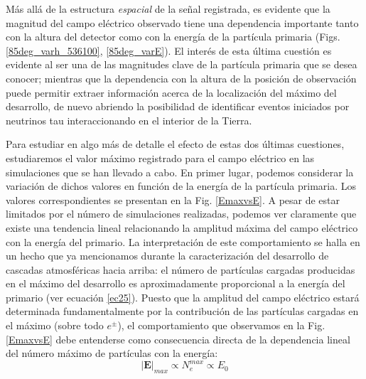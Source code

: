 \documentclass[11 pt, a4paper]{article} %
\numberwithin{equation}{section}
\numberwithin{figure}{section}
\numberwithin{table}{section}
\newcommand{\vect}[1]{\boldsymbol{\mathbf{#1}}}
\begin{document}
Más allá de la estructura \textit{espacial} de la señal registrada, es evidente que la magnitud del campo eléctrico observado tiene una dependencia importante tanto con la altura del detector como con la energía de la partícula primaria (Figs. \ref{85deg_varh_536100}, \ref{85deg_varE}). El interés de esta última cuestión es evidente al ser una de las magnitudes clave de la partícula primaria que se desea conocer; mientras que la dependencia con la altura de la posición de observación puede permitir extraer información acerca de la localización del máximo del desarrollo, de nuevo abriendo la posibilidad de identificar eventos iniciados por neutrinos tau interaccionando en el interior de la Tierra.

Para estudiar en algo más de detalle el efecto de estas dos últimas cuestiones, estudiaremos el valor máximo registrado para el campo eléctrico en las simulaciones que se han llevado a cabo. En primer lugar, podemos considerar la variación de dichos valores en función de la energía de la partícula primaria. Los valores correspondientes se presentan en la Fig. \ref{EmaxvsE}. A pesar de estar limitados por el número de simulaciones realizadas, podemos ver claramente que existe una tendencia lineal relacionando la amplitud máxima del campo eléctrico con la energía del primario. La interpretación de este comportamiento se halla en un hecho que ya mencionamos durante la caracterización del desarrollo de cascadas atmosféricas hacia arriba: el número de partículas cargadas producidas en el máximo del desarrollo es aproximadamente proporcional a la energía del primario (ver ecuación \ref{ec25}).
Puesto que la amplitud del campo eléctrico estará determinada fundamentalmente por la contribución de las partículas cargadas en el máximo (sobre todo $e^\pm$), el comportamiento que observamos en la Fig. \ref{EmaxvsE} debe entenderse como consecuencia directa de la dependencia lineal del número máximo de partículas con la energía:
\begin{equation}
	\left|\vect{E}\right|_{max}\propto N_{e}^{max}\propto E_0 \label{ec42}
\end{equation}
\end{document}
